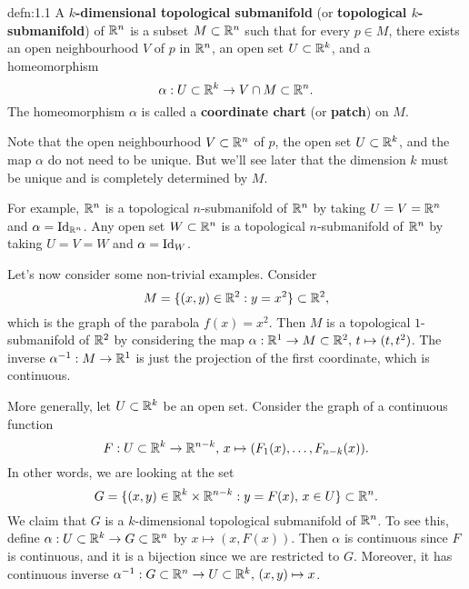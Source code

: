 \begin{defn}{defn:1.1}
    A {\bf $k$-dimensional topological submanifold} (or 
    {\bf topological $k$-submanifold}) of $\mathbb{R}^n$ is a subset $M \subset \mathbb{R}^n$ 
    such that for every $p \in M$, there exists an open neighbourhood $V$ 
    of $p$ in $\mathbb{R}^n$, an open set $U \subset \mathbb{R}^k$, and a homeomorphism 
    \[ \alpha : U \subset \mathbb{R}^k \to V \cap M \subset \mathbb{R}^n. \] 
    The homeomorphism $\alpha$ is called a {\bf coordinate chart} 
    (or {\bf patch}) on $M$.
\end{defn}

Note that the open neighbourhood $V \subset \mathbb{R}^n$ of $p$, the 
open set $U \subset \mathbb{R}^k$, and the map $\alpha$ do not need to be unique.
But we'll see later that the dimension $k$ must be unique and is completely 
determined by $M$.

For example, $\mathbb{R}^n$ is a topological $n$-submanifold of $\mathbb{R}^n$ 
by taking $U = V = \mathbb{R}^n$ and $\alpha = \operatorname{Id}_{\mathbb{R}^n}$. Any open set 
$W \subset \mathbb{R}^n$ is a topological $n$-submanifold of $\mathbb{R}^n$ by 
taking $U = V = W$ and $\alpha = \operatorname{Id}_W$. 

Let's now consider some non-trivial examples. Consider 
\[ M = \{(x, y) \in \mathbb{R}^2 : y = x^2\} \subset \mathbb{R}^2, \] 
which is the graph of the parabola $f(x) = x^2$. Then $M$ is a 
topological $1$-submanifold of $\mathbb{R}^2$ by considering the map 
$\alpha : \mathbb{R}^1 \to M \subset \mathbb{R}^2,\, t \mapsto (t, t^2)$.
The inverse $\alpha^{-1} : M \to \mathbb{R}^1$ is just the projection of the 
first coordinate, which is continuous. 

More generally, let $U \subset \mathbb{R}^k$ be an open set. Consider the graph of a 
continuous function 
\[ F : U \subset \mathbb{R}^k \to \mathbb{R}^{n-k},\, x \mapsto (F_1(x), \dots, F_{n-k}(x)). \]
In other words, we are looking at the set 
\[ G = \{(x, y) \in \mathbb{R}^k \times \mathbb{R}^{n-k} : y = F(x),\, x \in U\} \subset \mathbb{R}^n. \] 
We claim that $G$ is a $k$-dimensional topological submanifold of $\mathbb{R}^n$. To 
see this, define $\alpha : U \subset \mathbb{R}^k \to G \subset \mathbb{R}^n$ by 
$x \mapsto (x, F(x))$. Then $\alpha$ is continuous since $F$ is continuous, 
and it is a bijection since we are restricted to $G$. Moreover, 
it has continuous inverse $\alpha^{-1} : G \subset \mathbb{R}^n \to 
U \subset \mathbb{R}^k,\, (x, y) \mapsto x$. 

